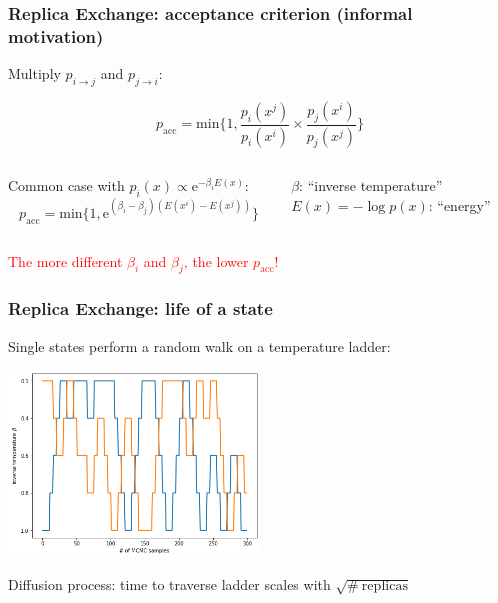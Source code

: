 \documentclass[t,aspectratio=169]{beamer}
\begin{document}
\begin{frame}[fragile]
  \frametitle{Replica Exchange: acceptance criterion (informal motivation)}
  Multiply $p_{i\rightarrow j}$ and $p_{j\rightarrow i}$:
  \begin{tcolorbox}[title=General acceptance criterion]
    \begin{equation*}
      p_{\mathrm{acc}}= \mathrm{min}\Bigg\{1, \frac{p_i(x^j)}{p_i(x^i)} \times \frac{p_j(x^i)}{p_j(x^j)}\Bigg\}
    \end{equation*}
  \end{tcolorbox}
  \begin{columns}
    \begin{column}[T]{0.5\textwidth}
      Common case with $p_i(x)\propto \mathrm{e}^{-\beta_i E(x)}$:
      \begin{equation*}
        p_{\mathrm{acc}} = \mathrm{min}\bigg\{1, \mathrm{e}^{(\beta_i-\beta_j)(E(x^i)-E(x^j))}\bigg\}
      \end{equation*}
    \end{column}
    \begin{column}[T]{0.43\textwidth}
      \begin{tcolorbox}[title=Physics terms]
        $\beta$: ``inverse temperature''\\
        $E(x)=-\log p(x)$: ``energy''
      \end{tcolorbox}
    \end{column}
  \end{columns}
  \bigskip
  \textcolor{red}{The more different $\beta_i$ and $\beta_j$, the lower $p_{\mathrm{acc}}$!}
\end{frame}

\begin{frame}
  \frametitle{Replica Exchange: life of a state}
  Single states perform a random walk on a temperature ladder:
  \begin{center}
    \includegraphics[width=0.5\textwidth]{images/state_trajectories}
  \end{center}
  Diffusion process: time to traverse ladder scales with $\sqrt{\#\mathrm{\ replicas}}$
\end{frame}
\end{document}
